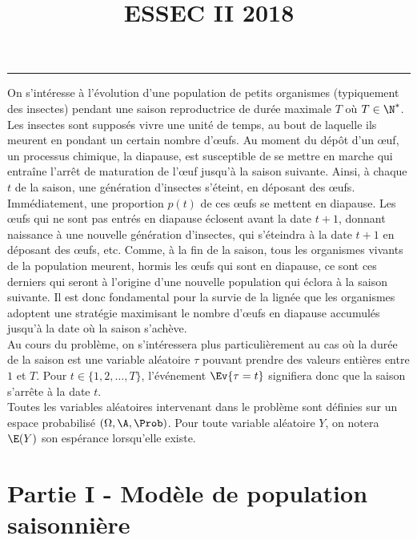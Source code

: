 \documentclass[11pt]{article}%
\title{\bf \vspace{-1.6cm} ESSEC II 2018} %
\author{} %
\date{} %
\begin{document}
\maketitle %
\vspace{-1.2cm}\hrule %
\thispagestyle{fancy}

\vspace*{.4cm}


\noindent
On s'intéresse à l'évolution d'une population de petits organismes
(typiquement des insectes) pendant une \og saison \fg{} reproductrice
de durée maximale $T$ où $T \in \N^*$. Les insectes sont supposés
vivre une unité de temps, au bout de laquelle ils meurent en pondant
un certain nombre d'{\oe}ufs. Au moment du dépôt d'un {\oe}uf, un
processus chimique, la diapause, est susceptible de se mettre en
marche qui entraîne l'arrêt de maturation de l'{\oe}uf jusqu'à la
saison suivante. Ainsi, à chaque $t$ de la saison, une génération
d'insectes s'éteint, en déposant des {\oe}ufs. Immédiatement, une
proportion $p(t)$ de ces {\oe}ufs se mettent en diapause. Les {\oe}ufs
qui ne sont pas entrés en diapause éclosent avant la date $t+1$,
donnant naissance à une nouvelle génération d'insectes, qui s'éteindra
à la date $t+1$ en déposant des {\oe}ufs, etc. Comme, à la fin de la
saison, tous les organismes vivants de la population meurent, hormis
les {\oe}ufs qui sont en diapause, ce sont ces derniers qui seront à
l'origine d'une nouvelle population qui éclora à la saison
suivante. Il est donc fondamental pour la survie de la lignée que les
organismes adoptent une stratégie maximisant le nombre d'{\oe}ufs en
diapause accumulés jusqu'à
la date où la saison s'achève.\\[.1cm]
Au cours du problème, on s'intéressera plus particulièrement au cas où
la durée de la saison est une variable aléatoire $\tau$ pouvant
prendre des valeurs entières entre $1$ et $T$. Pour $t\in \{1,2,
\ldots, T\}$, l'événement $\Ev{\tau=t}$ signifiera donc que la saison
s'arrête à la date $t$.\\[.1cm]
Toutes les variables aléatoires intervenant dans le problème sont
définies sur un espace probabilisé $(\Omega, \A, \Prob)$. Pour toute
variable aléatoire $Y$, on notera $\E(Y)$ son espérance lorsqu'elle
existe.



\section*{Partie I - Modèle de population saisonnière}
\end{document}
